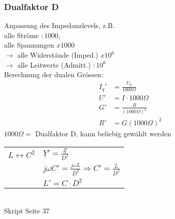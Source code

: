 \subsubsection{Dualfaktor D}
Anpassung des Impedanzlevels, z.B.\\
alle Ströme $:1000$,\\
alle Spannungen $x1000$\\
$\rightarrow$ alle Widerstände (Imped.) $x10^6$\\
$\rightarrow$ alle Leitwerte (Admitt.) $:10^6$\\
Berechnung der dualen Grössen:\\
\begin{align}
	I_q'&=\frac{U_q}{1000\Omega }\nonumber\\
	U'&=I\cdot 1000\Omega \nonumber\\
	G'&=\frac{R}{\left(1000\Omega\right)^2}\nonumber\\
	R'&=G\left(1000 \Omega\right)^2\nonumber
\end{align}
$1000 \Omega =$ Dualfaktor D, kann beliebig gewählt werden\\
\begin{tabular}{ll}
	$L \leftrightarrow C^2$ & $\underline{Y}'=\frac{\underline{Z}}{D^2}$\\
	& $j\omega C'=\frac{j \omega L}{D^2} \Rightarrow C'=\frac{L}{D^2}$\\
	& $L'=C\cdot D^2$
\end{tabular}\\
Skript Seite 37
